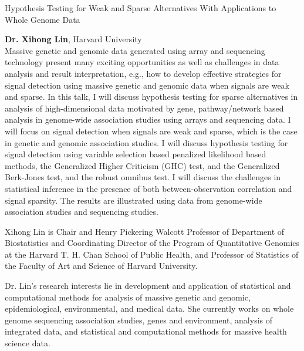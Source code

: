 
\begin{center}
\Large Hypothesis Testing for Weak and Sparse Alternatives With
Applications to Whole Genome Data \\[1em]
\end{center}
\normalsize \textbf{Dr. Xihong Lin}, Harvard University \\[.5em]

Massive genetic and genomic data generated using array and sequencing
technology present many exciting opportunities as well as challenges
in data analysis and result interpretation, e.g., how to develop
effective strategies for signal detection using massive genetic and
genomic data when signals are weak and sparse. In this talk, I will
discuss hypothesis testing for sparse alternatives in analysis of
high-dimensional data motivated by gene, pathway/network based
analysis in genome-wide association studies using arrays and
sequencing data. I will focus on signal detection when signals are
weak and sparse, which is the case in genetic and genomic association
studies. I will discuss hypothesis testing for signal detection using
variable selection based penalized likelihood based methods, the
Generalized Higher Criticism (GHC) test, and the Generalized
Berk-Jones test, and the robust omnibus test. I will discuss the
challenges in statistical inference in the presence of both
between-observation correlation and signal sparsity. The results are
illustrated using data from genome-wide association studies and
sequencing studies.

\hrulefill

\small Xihong Lin is Chair and Henry Pickering Walcott Professor of
Department of Biostatistics and Coordinating Director of the Program
of Quantitative Genomics at the Harvard T. H. Chan School of Public
Health, and Professor of Statistics of the Faculty of Art and Science
of Harvard University.

Dr. Lin's research interests lie in development
and application of statistical and computational methods for analysis
of massive genetic and genomic, epidemiological, environmental, and
medical data. She currently works on whole genome sequencing
association studies, genes and environment, analysis of integrated
data, and statistical and computational methods for massive health
science data.

